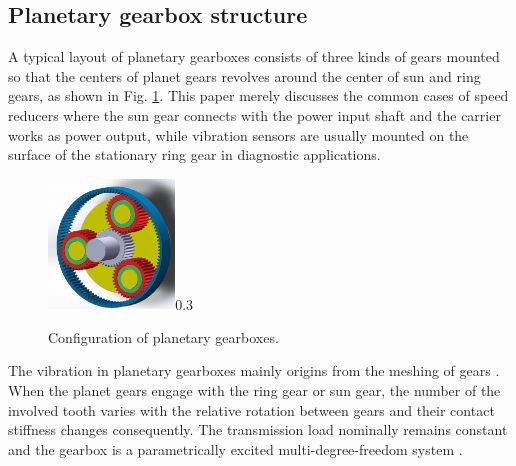 \documentclass[a4paper,fleqn]{cas-sc}%
\begin{document}
\subsection{Planetary gearbox structure}
\par A typical layout of planetary gearboxes consists of three kinds of gears mounted so that the centers of planet gears revolves around the center of sun and ring gears, as shown in Fig. \ref{fig:planetary_gearbox_layout}. This paper merely discusses the common cases of speed reducers where the sun gear connects with the power input shaft and the carrier works as power output, while vibration sensors are usually mounted on the surface of the stationary ring gear in diagnostic applications. 
\begin{figure}[pos=htbp]
    \centering
    \begin{annotate}{\includegraphics[width=0.3\textwidth]{Planetary_Gearbox.PNG}}{0.3}
    \end{annotate}
    \caption{Configuration of planetary gearboxes.}
    \label{fig:planetary_gearbox_layout}
\end{figure}
\par The vibration in planetary gearboxes mainly origins from the meshing of gears \cite{Velex1996}. When the planet gears engage with the ring gear or sun gear, the number of the involved tooth varies with the relative rotation between gears and their contact stiffness changes consequently. The transmission load nominally remains constant and the gearbox is a parametrically excited multi-degree-freedom system \cite{Acar2019}. 
\end{document}
